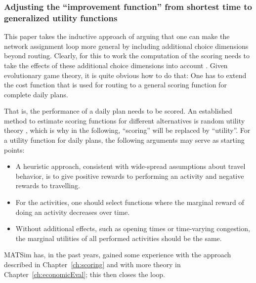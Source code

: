 
\subsubsection{Adjusting the ``improvement function'' from shortest
time to generalized utility functions}
\label{sec:adjust-impr-funct}

\def\perf{{\it perf}}


This paper takes the inductive approach of arguing that one can make
the network assignment loop more general by including additional
choice dimensions beyond routing.  Clearly, for this to work the
computation of the scoring needs to take the effects of these
additional choice dimensions into account \citep[also
  see][]{Balmer2007phd}.  Given evolutionary game theory, it is quite
obvious how to do that: One has to extend the cost
function that is used for routing to a general scoring function for
complete daily plans.


That is, the performance of a daily plan needs to be scored.  An
established method to estimate scoring functions for different
alternatives is random utility theory \citep[e.g.][]{ben-akiva-1985},
which is why in the following, ``scoring'' will be replaced by
``utility''.  For a utility function for daily plans, the following
arguments may serve as starting points:
\begin{itemize}

\item A heuristic approach, consistent with wide-spread assumptions
  about travel behavior, is to give positive rewards to performing an
  activity and negative rewards to travelling.

\item For the activities, one should select functions where the
  marginal reward of doing an activity decreases over time.

\item Without additional effects, such as opening times or
  time-varying congestion, the marginal utilities of all performed
  activities should be the same.  

\end{itemize}
MATSim has, in the past years, gained some experience with the approach described in Chapter~\ref{ch:scoring} and with more theory in Chapter~\ref{ch:economicEval}; this then closes the loop.  

